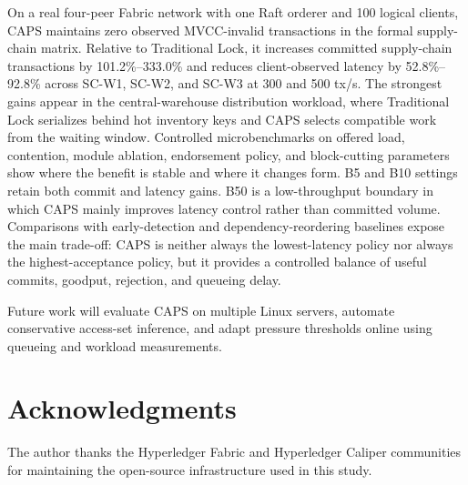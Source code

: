 \documentclass[fleqn,10pt,lineno]{wlpeerj}
\begin{document}
On a real four-peer Fabric network with one Raft orderer and 100 logical clients, CAPS maintains zero observed MVCC-invalid transactions in the formal supply-chain matrix. Relative to Traditional Lock, it increases committed supply-chain transactions by 101.2\%--333.0\% and reduces client-observed latency by 52.8\%--92.8\% across SC-W1, SC-W2, and SC-W3 at 300 and 500 tx/s. The strongest gains appear in the central-warehouse distribution workload, where Traditional Lock serializes behind hot inventory keys and CAPS selects compatible work from the waiting window. Controlled microbenchmarks on offered load, contention, module ablation, endorsement policy, and block-cutting parameters show where the benefit is stable and where it changes form. B5 and B10 settings retain both commit and latency gains. B50 is a low-throughput boundary in which CAPS mainly improves latency control rather than committed volume. Comparisons with early-detection and dependency-reordering baselines expose the main trade-off: CAPS is neither always the lowest-latency policy nor always the highest-acceptance policy, but it provides a controlled balance of useful commits, goodput, rejection, and queueing delay.

Future work will evaluate CAPS on multiple Linux servers, automate conservative access-set inference, and adapt pressure thresholds online using queueing and workload measurements.

\section*{Acknowledgments}

The author thanks the Hyperledger Fabric and Hyperledger Caliper communities for maintaining the open-source infrastructure used in this study.

\FloatBarrier


\end{document}
